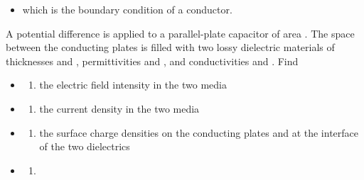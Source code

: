 \begin{ELjoin}

\begin{itemize}
\tightlist
\item
  which is the boundary condition of a conductor.
\end{itemize}


\begin{ELexample}{}

A potential difference  is applied to a parallel-plate capacitor of area . The space between the conducting plates is filled with two lossy dielectric materials of thicknesses  and , permittivities  and , and conductivities  and . Find

\begin{itemize}
\item
  \begin{enumerate}
  \def\labelenumi{(\alph{enumi})}
  \tightlist
  \item
    the electric field intensity in the two media
  \end{enumerate}
\item
  \begin{enumerate}
  \def\labelenumi{(\alph{enumi})}
  \setcounter{enumi}{1}
  \tightlist
  \item
    the current density in the two media
  \end{enumerate}
\item
  \begin{enumerate}
  \def\labelenumi{(\alph{enumi})}
  \setcounter{enumi}{2}
  \tightlist
  \item
    the surface charge densities on the conducting plates and at the interface of the two dielectrics
  \end{enumerate}
\end{itemize}


\begin{ELsolution}

\begin{itemize}
\item
  \begin{enumerate}
  \def\labelenumi{(\alph{enumi})}
  \tightlist
  \item
  \end{enumerate}
\end{itemize}


\end{ELsolution}
\end{ELexample}
\end{ELjoin}
